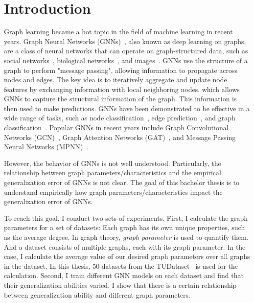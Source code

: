 \chapter{Introduction}\label{chap:introduction}
Graph learning became a hot topic in the field of machine learning in recent years. Graph Neural Networks (GNNs)~\cite{gori2005new}, also known as deep learning on graphs, are a class of neural networks that can operate on graph-structured data, such as social networks~\cite{easley2010networks}, biological networks~\cite{barabasi2004network}, and images~\cite{simonovsky2017dynamic}. GNNs use the structure of a graph to perform "message passing", allowing information to propagate across nodes and edges. The key idea is to iteratively aggregate and update node features by exchanging information with local neighboring nodes, which allows GNNs to capture the structural information of the graph. This information is then used to make predictions. GNNs have been demonstrated to be effective in a wide range of tasks, such as node classification~\cite{hamilton2017inductive}, edge prediction~\cite{morselli2021network}, and graph classification~\cite{gilmer2017neural}. Popular GNNs in recent years include Graph Convolutional Networks (GCN)~\cite{kipf2016semi}, Graph Attention Networks (GAT)~\cite{velickovic2020pointer}, and Message Passing Neural Networks (MPNN)~\cite{gilmer2017neural}.  

However, the behavior of GNNs is not well understood. Particularly, the relationship between graph parameters/characteristics and the empirical generalization error of GNNs is not clear.  The goal of this bachelor thesis is to understand empirically how graph parameters/characteristics impact the generalization error of GNNs. 

To reach this goal, I conduct two sets of experiments. First, I calculate the graph parameters for a set of datasets: Each graph has its own unique properties, such as the average degree. In graph theory, \textit{graph parameter} is used to quantify them. And a dataset consists of multiple graphs, each with its graph parameter. In the case, I calculate the average value of our desired graph parameters over all graphs in the dataset. In this thesis, 50 datasets from the TUDataset~\cite{morris2020tudataset} is used for the calculation. Second, I train different GNN models on each dataset and find that their generalization abilities varied. I show that there is a certain relationship between generalization ability and different graph parameters.

